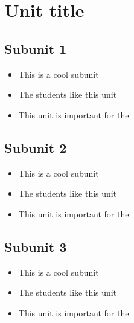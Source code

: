 \chapter{Unit title}
\section{Subunit 1}
\begin{multicols}{2}
	\begin{itemize}
        \item This is a cool subunit
        \item The students like this unit
        \item This unit is important for the
	\end{itemize}
\end{multicols}

\section{Subunit 2}
\begin{multicols}{2}
	\begin{itemize}
        \item This is a cool subunit
        \item The students like this unit
        \item This unit is important for the
	\end{itemize}
\end{multicols}

\section{Subunit 3}
\begin{multicols}{2}
	\begin{itemize}
        \item This is a cool subunit
        \item The students like this unit
        \item This unit is important for the
	\end{itemize}
\end{multicols}
